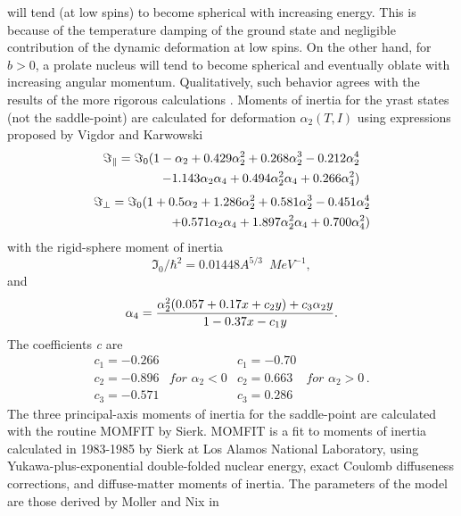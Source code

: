 will tend (at low spins) to become spherical with increasing energy. This is
because of the temperature damping of the ground state and negligible
contribution of the dynamic deformation at low spins. On the other hand, for 
$b>0$, a prolate nucleus will tend to become spherical and eventually oblate
with increasing angular momentum. Qualitatively, such behavior agrees with
the results of the more rigorous calculations \cite{and76}. Moments of
inertia for the yrast states (not the saddle-point) are calculated for
deformation $\alpha_{2}(T,I)$ using expressions proposed by Vigdor and
Karwowski \cite{VK} 
\begin{eqnarray}
\Im_{\parallel}=\Im_{0}(1-\alpha_{2}+0.429\alpha_{2}^{2}+0.268%
\alpha_{2}^{3}-0.212\alpha_{2}^{4}  \notag \\
-1.143\alpha_{2}\alpha_{4}+0.494\alpha_{2}^{2}\alpha_{4}+0.266\alpha_{4}^{2})
\label{MOMpar}
\end{eqnarray}
\begin{eqnarray}
\Im_{\perp}=\Im_{0}(1+0.5\alpha_{2}+1.286\alpha_{2}^{2}+0.581%
\alpha_{2}^{3}-0.451\alpha_{2}^{4}  \notag \\
+0.571\alpha_{2}\alpha_{4}+1.897\alpha_{2}^{2}\alpha_{4}+0.700\alpha_{4}^{2})
\label{MOMort}
\end{eqnarray}
with the rigid-sphere moment of inertia 
\begin{equation}
\Im_{0}/\hbar^{2}=0.01448A^{5/3}\,\,\, MeV^{-1},
\end{equation}
and 
\begin{equation}
\alpha_{4}=\frac{\alpha_{2}^{2}(0.057+0.17x+c_{2}y)+c_{3}\alpha_{2}y}{%
1-0.37x-c_{1}y}.
\end{equation}
The coefficients \emph{c} are 
\begin{equation}
\begin{array}{llll}
c_{1}=-0.266 &  & c_{1}=-0.70 &  \\ 
c_{2}=-0.896 & for\,\,\alpha_{2}<0 & c_{2}=0.663 & for\,\,\alpha_{2}>0\,. \\ 
c_{3}=-0.571 &  & c_{3}=0.286 & 
\end{array}%
\end{equation}
The three principal-axis moments of inertia for the saddle-point are
calculated with the routine MOMFIT \cite{sierk} by Sierk. MOMFIT is a fit to
moments of inertia calculated in 1983-1985 by Sierk at Los Alamos National
Laboratory, using Yukawa-plus-exponential double-folded nuclear energy,
exact Coulomb diffuseness corrections, and diffuse-matter moments of
inertia. The parameters of the model are those derived by Moller and Nix in
